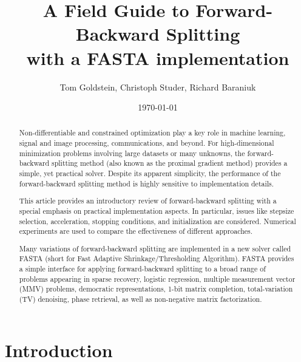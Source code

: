 \documentclass{amsart}
\theoremstyle{definition}
\begin{document}
\sloppy 

 

\title[A Field Guide to Forward-Backward Splitting]{    A Field Guide to Forward-Backward Splitting  \\ with a FASTA implementation }
\author{Tom Goldstein, Christoph Studer, Richard Baraniuk}
\date{\today}


\maketitle




\begin{abstract}\vspace{-1.0cm}
Non-differentiable and constrained optimization play a key role in machine learning, signal and image processing, communications, and beyond.
For high-dimensional minimization problems involving large datasets or many unknowns, the forward-backward splitting method (also known as the proximal gradient method) provides a simple, yet practical solver.
Despite its apparent simplicity, the performance of the forward-backward splitting method is highly sensitive to implementation details. 

This article provides an introductory review of forward-backward splitting with a special emphasis on practical implementation aspects.  In particular, issues like stepsize selection, acceleration, stopping conditions, and initialization are considered. Numerical experiments are used to compare the effectiveness of different approaches.  

 Many variations of forward-backward splitting are implemented in a new solver called FASTA (short for Fast Adaptive Shrinkage/Thresholding Algorithm).  FASTA provides a simple interface for applying forward-backward splitting to a broad range of problems appearing in sparse recovery, logistic regression, multiple measurement vector (MMV) problems, democratic representations, 1-bit matrix completion, total-variation (TV) denoising, phase retrieval, as well as non-negative matrix factorization. 


\end{abstract}

\tableofcontents


\section{Introduction}
\end{document}
